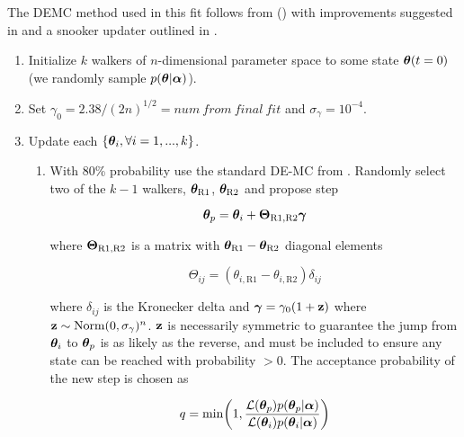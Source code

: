 The DEMC method used in this fit follows from
() with improvements suggested in  and a snooker updater outlined in .

\begin{enumerate}
\item Initialize $k$ walkers of $n$-dimensional parameter space to some state $\boldsymbol{\theta}(t = 0)$ (we randomly sample
$p(\boldsymbol{\theta}|\boldsymbol{\alpha})$).

\item Set $\gamma_0 = 2.38 / (2 n)^{1/2} = num\ from\ final\ fit$ and $\sigma_{\gamma} = 10^{-4}$.

\item \label{itm:update_demc} Update each $\{\boldsymbol{\theta}_i, \forall i = 1, ..., k\}$.
\begin{enumerate}
\item \label{itm:update_demc_normal} With 80\% probability use the standard DE-MC from .  Randomly
select two of the $k - 1$ walkers, $\boldsymbol{\theta}_{\mathrm{R1}}$, $\boldsymbol{\theta}_{\mathrm{R2}}$ and propose step

\begin{equation}
\boldsymbol{\theta}_p = \boldsymbol{\theta}_i + \boldsymbol{\Theta}_{\mathrm{R1, R2}} \boldsymbol{\gamma}
\label{eq:elifetime_fit_mcmc_update_demc}
\end{equation}

\noindent where $\boldsymbol{\Theta}_{\mathrm{R1, R2}}$ is a matrix with $\boldsymbol{\theta}_{\mathrm{R1}} - \boldsymbol{\theta}_{\mathrm{R2}}$ diagonal
elements

\begin{equation}
\Theta_{ij} = (\theta_{i, \mathrm{R1}} - \theta_{i, \mathrm{R2}}) \delta_{ij}
\end{equation}

\noindent where $\delta_{ij}$ is the Kronecker delta  and $\boldsymbol{\gamma} = \gamma_0 (1 + \mathbf{z})$ where
$\mathbf{z} \sim \mathrm{Norm}(0, \sigma_{\gamma})^n$.  $\mathbf{z}$ is necessarily symmetric to guarantee the jump from
$\boldsymbol{\theta}_i$ to $\boldsymbol{\theta}_p$ is as likely as the reverse, and must be included to ensure any state can be reached with
probability $> 0$.  The acceptance probability of the new step is chosen as

\begin{equation}
q = \mathrm{min} \bigg( 1, \frac{\mathcal{L}(\boldsymbol{\theta}_p) p(\boldsymbol{\theta}_p|\boldsymbol{\alpha})}
{\mathcal{L}(\boldsymbol{\theta}_i) p(\boldsymbol{\theta}_i|\boldsymbol{\alpha})} \bigg)
\label{eq:elifetime_fit_mcmc_acc_demc}
\end{equation}


\end{enumerate}
\end{enumerate}
